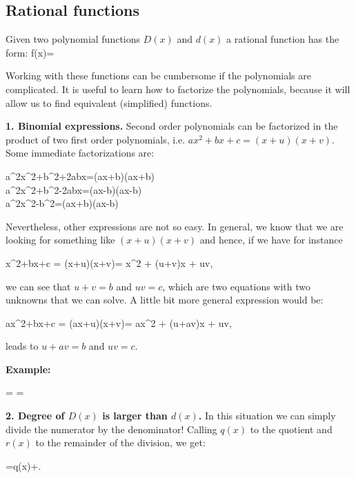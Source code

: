 \subsection{Rational functions}

Given two polynomial functions $D(x)$ and $d(x)$ a rational function has the form:
\bnn f(x)= \enn

Working with these functions can be cumbersome if the polynomials are complicated. It is
useful to learn how to factorize the polynomials, because it will allow us to find equivalent
(simplified) functions. 

{\bf 1. Binomial expressions.} Second order polynomials can be factorized in the product of two first order polynomials, i.e. $ax^2+bx+c = (x+u)(x+v)$. Some immediate factorizations are:

\bnn
 	a^2x^2+b^2+2abx=(ax+b)(ax+b)\\
 	a^2x^2+b^2-2abx=(ax-b)(ax-b)\\
    a^2x^2-b^2=(ax+b)(ax-b)
\enn 

Nevertheless, other expressions are not so easy. In general, we know that we are looking
for something like $(x+u)(x+v)$ and hence, if we have for instance

\bnn x^2+bx+c = (x+u)(x+v)= x^2 + (u+v)x + uv, \enn

we can see that $u+v=b$ and $uv=c$, which are two equations with two unknowns that we can solve. A little
bit more general expression would be:

\bnn ax^2+bx+c = (ax+u)(x+v)= ax^2 + (u+av)x + uv, \enn

leads to $u+av=b$ and $uv=c$. 

{\bf Example:}

\bnn
{} =  = 
\enn


{\bf 2. Degree of $D(x)$ is larger than $d(x)$. } In this situation we can simply divide the numerator
by the denominator! Calling $q(x)$ to the quotient and $r(x)$ to the remainder of the division, we get:

\bnn
	=q(x)+.
\enn

